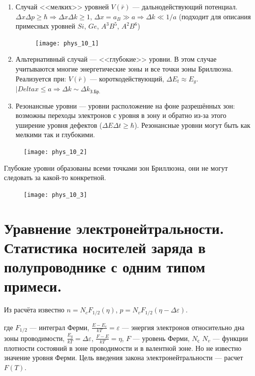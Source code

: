 \begin{enumerate}
    \item Случай <<мелких>> уровней $V(\bar{r})$ --- дальнодействующий потенциал. $\Delta x \Delta p \geq \hbar \Rightarrow \Delta x \Delta k \geq 1$, $\Delta x = a_B \gg a \Rightarrow \Delta k \ll 1/a$ (подходит для описания примесных уровней $Si$, $Ge$, $A^3B^5$, $A^2B^6$)
    
    \begin{figure}[h!]
        \centering
    \texttt{[image: phys\_10\_1]}
    \end{figure}

    \item Альтернативный случай --- <<глубокие>> уровни. В этом случае учитываются многие энергетические зоны и все точки зоны Бриллюэна. Реализуется при: $V(\bar{r})$ --- короткодействующий, $\Delta E_t \approx E_g$. $|Delta x \leq a \Rightarrow \Delta k \sim \Delta k_\text{З.Бр.}$
    \item Резонансные уровни --- уровни расположение на фоне разрешённых зон: возможны переходы электронов с уровня в зону и обратно из-за этого уширение уровня дефектов ($\Delta E \Delta t \geq \hbar$). Резонансные уровни могут быть как мелкими так и глубокими.
\end{enumerate}

\begin{figure}[h!]
    \centering
    \texttt{[image: phys\_10\_2]}
\end{figure}

Глубокие уровни образованы всеми точками зон Бриллюэна, они не могут следовать за какой-то конкретной.

\begin{figure}[h!]
    \centering
    \texttt{[image: phys\_10\_3]}
\end{figure}

\section{Уравнение электронейтральности. Статистика носителей заряда в полупроводнике с одним типом примеси.}

Из расчёта известно $n=N_c F_{1/2}(\eta)$, $p=N_v F_{1/2}(\eta - \Delta\varepsilon)$.

\noindent где $F_{1/2}$ --- интеграл Ферми, $\frac{E-E_{c}}{kT}=\varepsilon$ --- энергия электронов относительно дна зоны проводимости, $\frac{E_g}{kT}=\Delta \varepsilon$, $\frac{F-E}{kT}=\eta$, $F$ --- уровень Ферми, $N_{с}$ $N_{v}$ --- функции плотности состояний в зоне проводимости и в валентной зоне. Но не известно значение уровня Ферми. Цель введения закона электронейтральности --- расчет $F(T)$.

